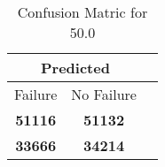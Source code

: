 \begin{table}[] 
\label{Table: Prediction Accuracy-DMD50.0OnlySunEKF-ignoreReflection-Reflection} 
\caption{Confusion Matric for 50.0} 
\centering 
\begin{tabular} 
 {@{}ccc@{}} 
\toprule 
\multicolumn{2}{c}{\textbf{Predicted}}
 \\ \midrule 
\multicolumn{1}{|c|}{Failure} & 
\multicolumn{1}{c|}{No Failure}
 \\ \midrule 
\multicolumn{1}{|c|}{\color{green}\textbf{51116}} & 
\multicolumn{1}{c|}{\color{green}\textbf{51132}}
 \\ \midrule 
\multicolumn{1}{|c|}{\color{red}\textbf{33666}} & 
\multicolumn{1}{c|}{\color{red}\textbf{34214}}
 \\ \bottomrule 
\end{tabular} 
\end{table} 
